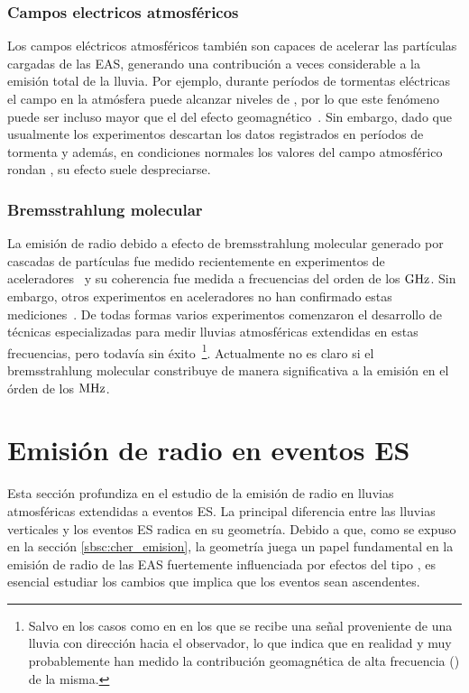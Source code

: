 	\subsubsection{Campos electricos atmosf\'ericos}
	Los campos el\'ectricos atmosf\'ericos tambi\'en son capaces de acelerar las part\'iculas cargadas de las EAS, generando una contribuci\'on a veces considerable a la emisi\'on total de la lluvia. 
	Por ejemplo, durante per\'iodos de tormentas el\'ectricas el campo en la atm\'osfera puede alcanzar niveles de , por lo que este fen\'omeno puede ser incluso mayor que el del efecto geomagn\'etico~\cite{atmosphericField}.
	Sin embargo, dado que usualmente los experimentos descartan los datos registrados en per\'iodos de tormenta y adem\'as, en condiciones normales los valores del campo atmosf\'erico rondan , su efecto suele despreciarse.
	
	
	\subsubsection{Bremsstrahlung molecular}
	
	La emisi\'on de radio debido a efecto de bremsstrahlung molecular generado por cascadas de part\'iculas fue medido recientemente en experimentos de aceleradores~\cite{bremsstrahlungMolec} y su coherencia fue medida a frecuencias del orden de los $\rm GHz$.
	Sin embargo, otros experimentos en aceleradores no han confirmado estas mediciones~\cite{AMY}.
	De todas formas varios experimentos comenzaron el desarrollo de t\'ecnicas especializadas para medir lluvias atmosf\'ericas extendidas en estas frecuencias, pero todav\'ia sin \'exito~\cite{cite:midas}\footnote{Salvo en los casos como en \cite{cite:CHROME} en los que se recibe una se\~nal proveniente de una lluvia con direcci\'on hacia el observador, lo que indica que en realidad y muy probablemente han medido la contribuci\'on geomagn\'etica de alta frecuencia () de la misma.}.
	Actualmente no es claro si el bremsstrahlung molecular constribuye de manera significativa a la emisi\'on en el \'orden de los $\rm MHz$.
	
\section{Emisi\'on de radio en eventos ES}
\label{sc:toymodel}
	
	Esta secci\'on profundiza en el estudio de la emisi\'on de radio en lluvias atmosf\'ericas extendidas a eventos ES. 
	La principal diferencia entre las lluvias verticales y los eventos ES radica en su geometr\'ia.
	Debido a que, como se expuso en la secci\'on \ref{sbsc:cher_emision}, la geometr\'ia juega un papel fundamental en la emisi\'on de radio de las EAS fuertemente influenciada por efectos del tipo \cher{}, es esencial estudiar los cambios que implica que los eventos sean ascendentes.
	
